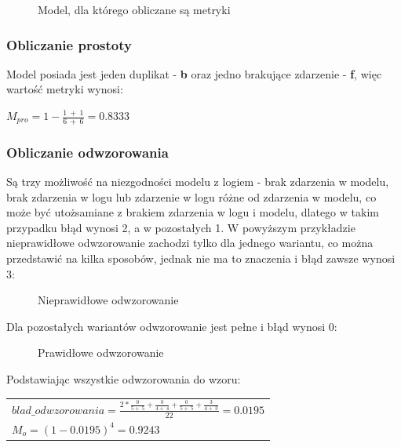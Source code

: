 \begin{figure}[h]
	\caption{\label{fig:metrics_business_process}Model, dla którego obliczane są metryki}
\end{figure}

\subsubsection{Obliczanie prostoty}
Model posiada jest jeden duplikat - \textbf{b} oraz jedno brakujące zdarzenie - \textbf{f}, więc wartość metryki wynosi:
\begin{center}
$M_{pro} = 1 - \frac{1\ +\ 1}{6\ +\ 6} = 0.8333$
\end{center}

\subsubsection{Obliczanie odwzorowania}
\label{sec:alignment-calculation}
Są trzy możliwość na niezgodności modelu z logiem -  brak zdarzenia w modelu, brak zdarzenia w logu lub zdarzenie w logu różne od zdarzenia w modelu, co może być utożsamiane z brakiem zdarzenia w logu i modelu, dlatego w takim przypadku błąd wynosi 2, a w pozostałych 1. W powyższym przykładzie nieprawidłowe odwzorowanie zachodzi tylko dla jednego wariantu, co można przedstawić na kilka sposobów, jednak nie ma to znaczenia i błąd zawsze wynosi 3:
\begin{figure}[H]
	\caption{\label{fig:bad-alignment}Nieprawidłowe odwzorowanie}
\end{figure}
Dla pozostałych wariantów odwzorowanie jest pełne i błąd wynosi 0:
\begin{figure}[H]
	\caption{\label{fig:good-alignment}Prawidłowe odwzorowanie}
\end{figure}
Podstawiając wszystkie odwzorowania do wzoru:
\begin{center}
\begin{tabular}{l}
$blad\_odwzorowania = \frac{2 * \frac{0}{5 +\ 5} + \frac{0}{4 +\ 4} + \frac{0}{5 +\ 5} + \frac{3}{4 +\ 3}}{22} = 0.0195$ \\

$M_o = (1 - 0.0195)^4 = 0.9243$
\end{tabular}
\end{center}


